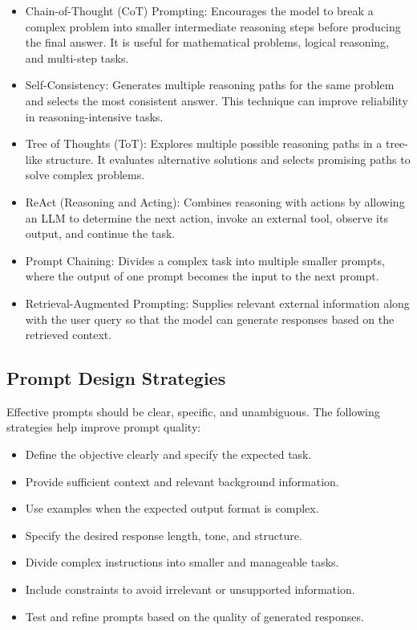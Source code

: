 \begin{itemize}
    \item Chain-of-Thought (CoT) Prompting: Encourages the model to break a complex problem into smaller intermediate reasoning steps before producing the final answer. It is useful for mathematical problems, logical reasoning, and multi-step tasks.
    
    \item Self-Consistency: Generates multiple reasoning paths for the same problem and selects the most consistent answer. This technique can improve reliability in reasoning-intensive tasks.
    
    \item Tree of Thoughts (ToT): Explores multiple possible reasoning paths in a tree-like structure. It evaluates alternative solutions and selects promising paths to solve complex problems.
    
    \item ReAct (Reasoning and Acting): Combines reasoning with actions by allowing an LLM to determine the next action, invoke an external tool, observe its output, and continue the task.
    
    \item Prompt Chaining: Divides a complex task into multiple smaller prompts, where the output of one prompt becomes the input to the next prompt.
    
    \item Retrieval-Augmented Prompting: Supplies relevant external information along with the user query so that the model can generate responses based on the retrieved context.
\end{itemize}

\subsection{Prompt Design Strategies}

Effective prompts should be clear, specific, and unambiguous. The following strategies help improve prompt quality:

\begin{itemize}
    \item Define the objective clearly and specify the expected task.
    
    \item Provide sufficient context and relevant background information.
    
    \item Use examples when the expected output format is complex.
    
    \item Specify the desired response length, tone, and structure.
    
    \item Divide complex instructions into smaller and manageable tasks.
    
    \item Include constraints to avoid irrelevant or unsupported information.
    
    \item Test and refine prompts based on the quality of generated responses.
\end{itemize}


